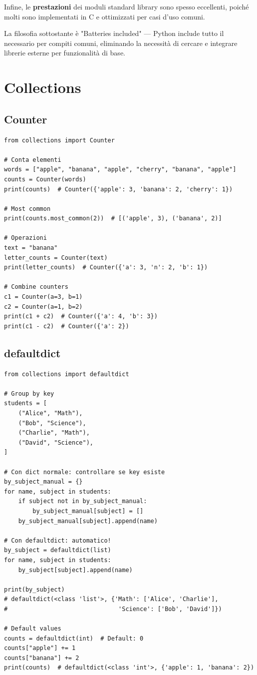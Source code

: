 Infine, le \textbf{prestazioni} dei moduli standard library sono spesso eccellenti, poiché molti sono implementati in C e ottimizzati per casi d'uso comuni.

La filosofia sottostante è "Batteries included" — Python include tutto il necessario per compiti comuni, eliminando la necessità di cercare e integrare librerie esterne per funzionalità di base.

\section{Collections}

\subsection{Counter}

\begin{lstlisting}
from collections import Counter

# Conta elementi
words = ["apple", "banana", "apple", "cherry", "banana", "apple"]
counts = Counter(words)
print(counts)  # Counter({'apple': 3, 'banana': 2, 'cherry': 1})

# Most common
print(counts.most_common(2))  # [('apple', 3), ('banana', 2)]

# Operazioni
text = "banana"
letter_counts = Counter(text)
print(letter_counts)  # Counter({'a': 3, 'n': 2, 'b': 1})

# Combine counters
c1 = Counter(a=3, b=1)
c2 = Counter(a=1, b=2)
print(c1 + c2)  # Counter({'a': 4, 'b': 3})
print(c1 - c2)  # Counter({'a': 2})
\end{lstlisting}

\subsection{defaultdict}

\begin{lstlisting}
from collections import defaultdict

# Group by key
students = [
    ("Alice", "Math"),
    ("Bob", "Science"),
    ("Charlie", "Math"),
    ("David", "Science"),
]

# Con dict normale: controllare se key esiste
by_subject_manual = {}
for name, subject in students:
    if subject not in by_subject_manual:
        by_subject_manual[subject] = []
    by_subject_manual[subject].append(name)

# Con defaultdict: automatico!
by_subject = defaultdict(list)
for name, subject in students:
    by_subject[subject].append(name)

print(by_subject)
# defaultdict(<class 'list'>, {'Math': ['Alice', 'Charlie'],
#                               'Science': ['Bob', 'David']})

# Default values
counts = defaultdict(int)  # Default: 0
counts["apple"] += 1
counts["banana"] += 2
print(counts)  # defaultdict(<class 'int'>, {'apple': 1, 'banana': 2})
\end{lstlisting}

